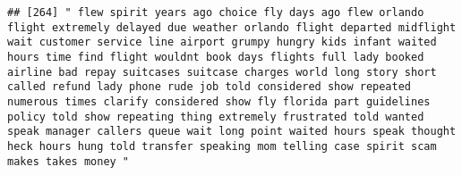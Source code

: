 \documentclass[
]{article}
\begin{document}
\begin{verbatim}
## [264] " flew spirit years ago choice fly days ago flew orlando flight extremely delayed due weather orlando flight departed midflight wait customer service line airport grumpy hungry kids infant waited hours time find flight wouldnt book days flights full lady booked airline bad repay suitcases suitcase charges world long story short called refund lady phone rude job told considered show repeated numerous times clarify considered show fly florida part guidelines policy told show repeating thing extremely frustrated told wanted speak manager callers queue wait long point waited hours speak thought heck hours hung told transfer speaking mom telling case spirit scam makes takes money "                                                                                                                                                                                                                                                                                                                                                                                                                                                                                                                                                                                                                                                                                                                                                                                                                                                                                                                                                                                                                                                                                   

\end{verbatim}
\end{document}
